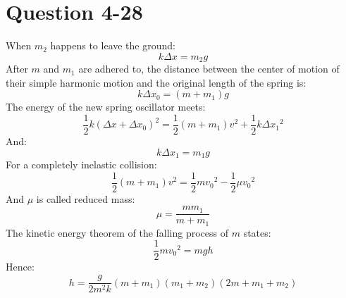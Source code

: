 \documentclass[12pt,a4paper]{article}%
\begin{document}
	\section{Question 4-28}
	\noindent When $m_2$ happens to leave the ground:
	\begin{equation}
		k\Delta x=m_2g
	\end{equation}
	After $m$ and $m_1$ are adhered to, the distance between the center of motion of their simple harmonic motion and the original length of the spring is:
	\begin{equation}
		k\Delta x_0=(m+m_1)g
	\end{equation}
	The energy of the new spring oscillator meets:
	\begin{equation}
		\frac{1}{2}k\left( \Delta x+\Delta x_0 \right) ^2=\frac{1}{2}\left( m+m_1 \right) v^2+\frac{1}{2}k\Delta {x_1}^2
	\end{equation}
	And:
	\begin{equation}
		k\Delta x_1=m_1g
	\end{equation}
	For a completely inelastic collision:
	\begin{equation}
		\frac{1}{2}\left( m+m_1 \right) v^2=\frac{1}{2}{mv_0}^2-\frac{1}{2}{\mu v_0}^2
	\end{equation}
	And $\mu$ is called reduced mass:
	\begin{equation}
		\mu =\frac{mm_1}{m+m_1}
	\end{equation}
	The kinetic energy theorem of the falling process of $m$ states:
	\begin{equation}
		\frac{1}{2}{mv_0}^2=mgh
	\end{equation}
	Hence:
	\begin{equation*}
		h=\frac{g}{2m^2k}\left( m+m_1 \right) \left( m_1+m_2 \right) \left( 2m+m_1+m_2 \right) 
	\end{equation*}
	
	

	
	
	
	
	
	
	
	
\end{document}
